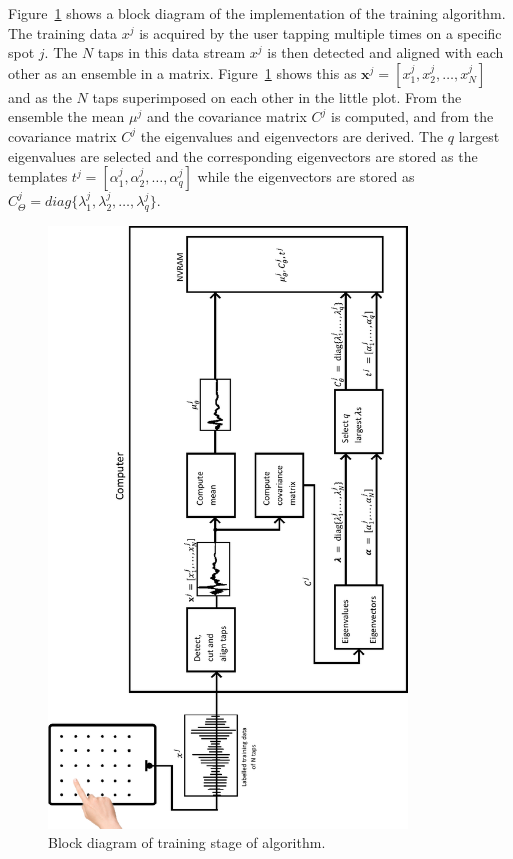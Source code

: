 Figure~\ref{fig:trainingsytemRotate} shows a block diagram of the implementation of the training algorithm. The training data $x^j$ is acquired by the user tapping multiple times on a specific spot $j$. The $N$ taps in this data stream $x^j$ is then detected and aligned with each other as an ensemble in a matrix. Figure~\ref{fig:trainingsytemRotate} shows this as $\textbf{x}^j =  [ x_1^j, x_2^j, \ldots , x_N^j ] $ and as the $N$ taps superimposed on each other in the little plot. From the ensemble the mean $\mu^j$ and the covariance matrix $C^j$ is computed, and from the covariance matrix $C^j$ the eigenvalues and eigenvectors are derived. The $q$ largest eigenvalues are selected and the corresponding eigenvectors are stored as the templates $t^j = [\alpha^j_1,\alpha^j_2,\ldots,\alpha^j_q] $ while the eigenvectors are stored as $C_\Theta^j = diag\{\lambda_1^j,\lambda_2^j,\ldots,\lambda_q^j \}$.

\begin{figure}[!]
\centering
\includegraphics[width=360px]{trainingsytemRotate.pdf}
\caption{Block diagram of training stage of algorithm.}\label{fig:trainingsytemRotate}
\end{figure}


